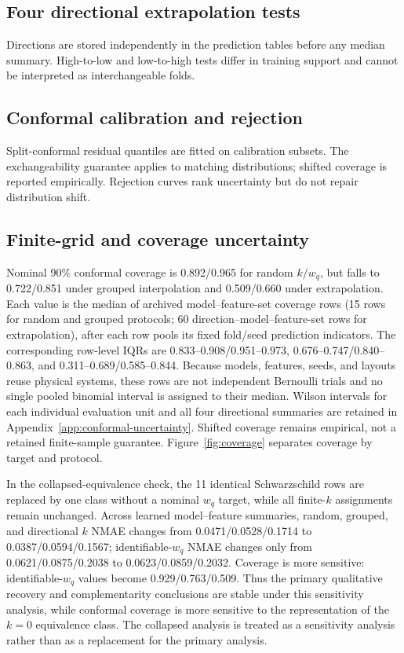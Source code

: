 \documentclass[11pt]{article}
\newcommand{\wq}{w_q}
\begin{document}
\subsection{Four directional extrapolation tests}
Directions are stored independently in the prediction tables before any median
summary. High-to-low and low-to-high tests differ in training support and cannot
be interpreted as interchangeable folds.

\subsection{Conformal calibration and rejection}
Split-conformal residual quantiles are fitted on calibration subsets. The
exchangeability guarantee applies to matching distributions; shifted coverage
is reported empirically. Rejection curves rank uncertainty but do not repair
distribution shift.

\subsection{Finite-grid and coverage uncertainty}
Nominal 90\% conformal coverage is 0.892/0.965 for random $k/\wq$, but falls to
0.722/0.851 under grouped interpolation and 0.509/0.660 under extrapolation.
Each value is the median of archived model--feature-set coverage rows (15 rows
for random and grouped protocols; 60 direction--model--feature-set rows for
extrapolation), after each row pools its fixed fold/seed prediction
indicators. The corresponding row-level IQRs are 0.833--0.908/0.951--0.973,
0.676--0.747/0.840--0.863, and 0.311--0.689/0.585--0.844. Because models,
features, seeds, and layouts reuse physical systems, these rows are not
independent Bernoulli trials and no single pooled binomial interval is assigned
to their median. Wilson intervals for each individual evaluation unit and all
four directional summaries are retained in Appendix~\ref{app:conformal-uncertainty}.
Shifted coverage remains empirical, not a retained finite-sample guarantee.
Figure~\ref{fig:coverage} separates coverage by target and protocol.

In the collapsed-equivalence check, the 11 identical Schwarzschild rows are
replaced by one class without a nominal $\wq$ target, while all finite-$k$
assignments remain unchanged. Across learned model--feature summaries, random,
grouped, and directional $k$ NMAE changes from 0.0471/0.0528/0.1714 to
0.0387/0.0594/0.1567; identifiable-$\wq$ NMAE changes only from
0.0621/0.0875/0.2038 to 0.0623/0.0859/0.2032. Coverage is more sensitive:
identifiable-$\wq$ values become 0.929/0.763/0.509. Thus the primary qualitative
recovery and complementarity conclusions are stable under this sensitivity
analysis, while conformal coverage is more sensitive to the representation of
the $k=0$ equivalence class. The collapsed analysis is treated as a sensitivity
analysis rather than as a replacement for the primary analysis.
\end{document}
